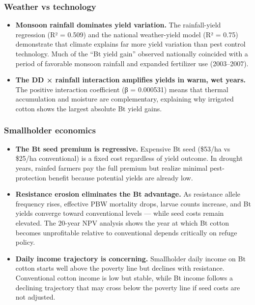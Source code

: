 \subsubsection{Weather vs technology}



\label{14336285235706744004}{}


\begin{itemize}
\item[1. ] \textbf{Monsoon rainfall dominates yield variation.} The rainfall-yield  regression (R² = 0.509) and the national weather-yield model (R² =  0.75) demonstrate that climate explains far more yield variation  than pest control technology. Much of the “Bt yield gain” observed  nationally coincided with a period of favorable monsoon rainfall and  expanded fertilizer use (2003–2007).


\item[2. ] \textbf{The DD × rainfall interaction amplifies yields in warm, wet  years.} The positive interaction coefficient (β = 0.000531) means  that thermal accumulation and moisture are complementary, explaining  why irrigated cotton shows the largest absolute Bt yield gains.

\end{itemize}


\subsubsection{Smallholder economics}



\label{3548913153831467557}{}


\begin{itemize}
\item[1. ] \textbf{The Bt seed premium is regressive.} Expensive Bt seed (\$53/ha vs  \$25/ha conventional) is a fixed cost regardless of yield outcome.  In drought years, rainfed farmers pay the full premium but realize  minimal pest-protection benefit because potential yields are already  low.


\item[2. ] \textbf{Resistance erosion eliminates the Bt advantage.} As resistance  allele frequency rises, effective PBW mortality drops, larvae counts  increase, and Bt yields converge toward conventional levels — while  seed costs remain elevated. The 20-year NPV analysis shows the year  at which Bt cotton becomes unprofitable relative to conventional  depends critically on refuge policy.


\item[3. ] \textbf{Daily income trajectory is concerning.} Smallholder daily income  on Bt cotton starts well above the poverty line but declines with  resistance. Conventional cotton income is low but stable, while Bt  income follows a declining trajectory that may cross below the  poverty line if seed costs are not adjusted.

\end{itemize}


